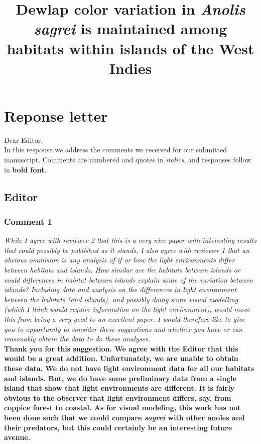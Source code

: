 \documentclass{article}
\title{Dewlap color variation in \textit{Anolis sagrei} is maintained among habitats within islands of the West Indies}
\date{}
\begin{document}
	
	\maketitle
	
	\section*{Reponse letter}
	
	Dear Editor,\\
	
	In this response we address the comments we received for our submitted manuscript. Comments are numbered and quotes in \textit{italics}, and responses follow in \textbf{bold font}.
	
	\pagebreak
	
	\subsection*{Editor}
	
	\subsubsection*{Comment 1}
	
	\textit{While I agree with reviewer 2 that this is a very nice paper with interesting results that could possibly be published as it stands, I also agree with reviewer 1 that an obvious ommision is any analysis of if or how the light environments differ between habitats and islands. How similar are the habitats between islands or could differences in habitat between islands explain some of the variation between islands? Including data and analysis on the differences in light environment between the habitats (and islands), and possibly doing some visual modelling (which I think would require information on the light environment), would move this from being a very good to an excellent paper. I would therefore like to give you to opportunity to consider these suggestions and whether you have or can reasonably obtain the data to do these analyses.}\\
	
	\textbf{Thank you for this suggestion. We agree with the Editor that this would be a great addition. Unfortunately, we are unable to obtain these data. We do not have light environment data for all our habitats and islands. But, we do have some preliminary data from a single island that show that light environments are different. It is fairly obvious to the observer that light environment differs, say, from coppice forest to coastal. 
	As for visual modeling, this work has not been done such that we could compare \textit{sagrei} with other anoles and their predators, but this could certainly be an interesting future avenue.}
\end{document}
